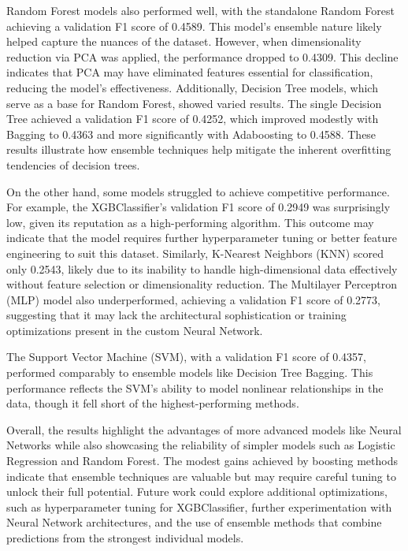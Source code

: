\documentclass{article} %
\begin{document}
Random Forest models also performed well, with the standalone Random Forest achieving a validation F1 score of 0.4589. This model's ensemble nature likely helped capture the nuances of the dataset. However, when dimensionality reduction via PCA was applied, the performance dropped to 0.4309. This decline indicates that PCA may have eliminated features essential for classification, reducing the model's effectiveness. Additionally, Decision Tree models, which serve as a base for Random Forest, showed varied results. The single Decision Tree achieved a validation F1 score of 0.4252, which improved modestly with Bagging to 0.4363 and more significantly with Adaboosting to 0.4588. These results illustrate how ensemble techniques help mitigate the inherent overfitting tendencies of decision trees.

On the other hand, some models struggled to achieve competitive performance. For example, the XGBClassifier's validation F1 score of 0.2949 was surprisingly low, given its reputation as a high-performing algorithm. This outcome may indicate that the model requires further hyperparameter tuning or better feature engineering to suit this dataset. Similarly, K-Nearest Neighbors (KNN) scored only 0.2543, likely due to its inability to handle high-dimensional data effectively without feature selection or dimensionality reduction. The Multilayer Perceptron (MLP) model also underperformed, achieving a validation F1 score of 0.2773, suggesting that it may lack the architectural sophistication or training optimizations present in the custom Neural Network.

The Support Vector Machine (SVM), with a validation F1 score of 0.4357, performed comparably to ensemble models like Decision Tree Bagging. This performance reflects the SVM's ability to model nonlinear relationships in the data, though it fell short of the highest-performing methods.

Overall, the results highlight the advantages of more advanced models like Neural Networks while also showcasing the reliability of simpler models such as Logistic Regression and Random Forest. The modest gains achieved by boosting methods indicate that ensemble techniques are valuable but may require careful tuning to unlock their full potential. Future work could explore additional optimizations, such as hyperparameter tuning for XGBClassifier, further experimentation with Neural Network architectures, and the use of ensemble methods that combine predictions from the strongest individual models. 
\end{document}
